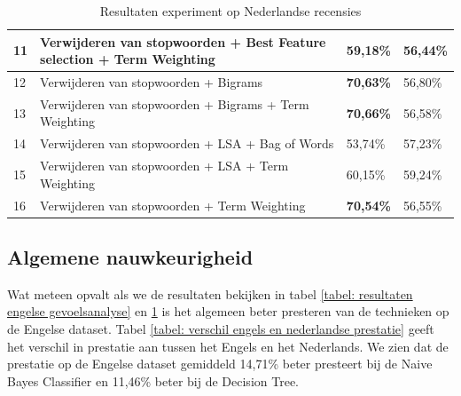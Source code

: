 \begin{table}[H]
\begin{adjustbox}{width=1\textwidth}
\begin{tabular}{|l|l|l|l|}
11       & Verwijderen van stopwoorden + Best Feature selection + Term Weighting         & 59,18\%                                 & 56,44\%                        \\ \hline
12       & Verwijderen van stopwoorden + Bigrams                                     & {\bf 70,63\%}                           & 56,80\%                        \\ \hline
13       & Verwijderen van stopwoorden + Bigrams + Term Weighting                    & {\bf 70,66\%}                           & 56,58\%                        \\ \hline
14       & Verwijderen van stopwoorden + LSA + Bag of Words                     & 53,74\%                                 & 57,23\%                        \\ \hline
15       & Verwijderen van stopwoorden + LSA + Term Weighting                            & 60,15\%                                 & 59,24\%                        \\ \hline
16       & Verwijderen van stopwoorden + Term Weighting                                         & {\bf 70,54\%}                           & 56,55\%                        \\ \hline
\end{tabular}
\end{adjustbox}

\caption{Resultaten experiment op Nederlandse recensies}
\label{tabel: resultaten Nederlandse gevoelsanalyse}
\end{table}

\subsection{Algemene nauwkeurigheid}

Wat meteen opvalt als we de resultaten bekijken in tabel \ref{tabel: resultaten engelse gevoelsanalyse} en \ref{tabel: resultaten Nederlandse gevoelsanalyse} is het algemeen beter presteren van de technieken op de Engelse dataset. Tabel \ref{tabel: verschil engels en nederlandse prestatie} geeft het verschil in prestatie aan tussen het Engels en het Nederlands. We zien dat de prestatie op de Engelse dataset gemiddeld 14,71\% beter presteert bij de Naive Bayes Classifier en 11,46\% beter bij de Decision Tree.


